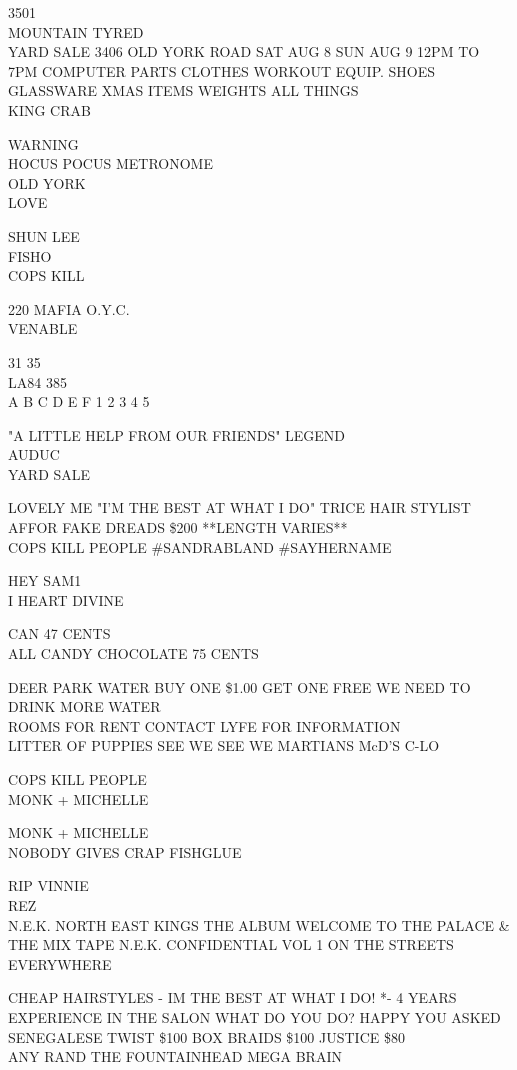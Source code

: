 \documentclass[10pt,letterpaper]{article}
\begin{document}
3501\\
MOUNTAIN TYRED\\
YARD SALE 3406 OLD YORK ROAD SAT AUG 8 SUN AUG 9 12PM TO 7PM COMPUTER PARTS CLOTHES WORKOUT EQUIP. SHOES GLASSWARE XMAS ITEMS WEIGHTS ALL THINGS\\
KING CRAB

WARNING\\
HOCUS POCUS METRONOME\\
OLD YORK\\
LOVE

SHUN LEE\\
FISHO\\
COPS KILL

220 MAFIA O.Y.C.\\
VENABLE

31 35\\
LA84 385\\
A B C D E F 1 2 3 4 5

"A LITTLE HELP FROM OUR FRIENDS" LEGEND\\
AUDUC\\
YARD SALE

LOVELY ME "I'M THE BEST AT WHAT I DO" TRICE HAIR STYLIST\\
AFFOR FAKE DREADS \$200 **LENGTH VARIES**\\
COPS KILL PEOPLE \#SANDRABLAND \#SAYHERNAME

HEY SAM1\\
I HEART DIVINE

CAN 47 CENTS\\
ALL CANDY CHOCOLATE 75 CENTS

DEER PARK WATER BUY ONE \$1.00 GET ONE FREE WE NEED TO DRINK MORE WATER\\
ROOMS FOR RENT CONTACT LYFE FOR INFORMATION\\
LITTER OF PUPPIES SEE WE SEE WE MARTIANS McD'S C{-}LO

COPS KILL PEOPLE\\
MONK + MICHELLE

MONK + MICHELLE\\
NOBODY GIVES CRAP FISHGLUE

RIP VINNIE\\
REZ\\
N.E.K. NORTH EAST KINGS THE ALBUM WELCOME TO THE PALACE \& THE MIX TAPE N.E.K. CONFIDENTIAL VOL 1 ON THE STREETS EVERYWHERE

CHEAP HAIRSTYLES {-} IM THE BEST AT WHAT I DO!  *{-} 4 YEARS EXPERIENCE IN THE SALON WHAT DO YOU DO?  HAPPY YOU ASKED SENEGALESE TWIST \$100 BOX BRAIDS \$100 JUSTICE \$80\\
ANY RAND THE FOUNTAINHEAD MEGA BRAIN
\end{document}
